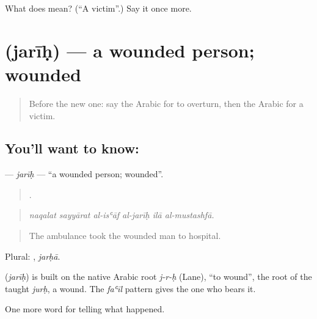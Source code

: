 \begin{tcolorbox}[breakable,colback=teal!4,colframe=teal!35!black,title={Before you move on}]
What does  mean? (\textquotedblleft{}A victim\textquotedblright{}.) Say it once more.
\end{tcolorbox}
\section[\texorpdfstring{\ar{جريح} (jarīḥ)}{جريح (jarīḥ)}]{ (jarīḥ) — a wounded person; wounded}

\label{lesson:AR-C301-jarih}



\begin{quote}
Before the new one: say the Arabic for to overturn, then the Arabic for a victim.
\end{quote}

\subsection*{You'll want to know: }
\textbf{} — \emph{jarīḥ} — \textquotedblleft{}a wounded person; wounded\textquotedblright{}.

\begin{quote}
     .
\end{quote}

\begin{quote}
\emph{naqalat sayyārat al-isʿāf al-jarīḥ ilā al-mustashfā.}
\end{quote}

\begin{quote}
The ambulance took the wounded man to hospital.
\end{quote}

Plural: , \emph{jarḥā}.

\begin{cousinweb}
\textbf{} (\emph{jarīḥ}) is built on the native Arabic root \emph{j-r-ḥ} (Lane), \textquotedblleft{}to wound\textquotedblright{}, the root of the taught \emph{jurḥ}, a wound. The \emph{faʿīl} pattern gives the one who bears it.
\end{cousinweb}

\begin{grammarlens}[title={What you've built}]
One more word for telling what happened.
\end{grammarlens}

